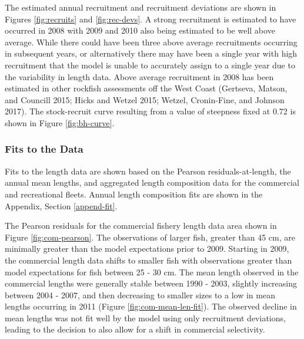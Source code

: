 \documentclass[11pt,
  english,
  a4paper,
]{article}
\begin{document}

The estimated annual recruitment and recruitment deviations are shown in Figures \ref{fig:recruits} and \ref{fig:rec-devs}. A strong recruitment is estimated to have occurred in 2008 with 2009 and 2010 also being estimated to be well above average. While there could have been three above average recruitments occurring in subsequent years, or alternatively there may have been a single year with high recruitment that the model is unable to accurately assign to a single year due to the variability in length data. Above average recruitment in 2008 has been estimated in other rockfish assessments off the West Coast {(Gertseva, Matson, and Councill 2015; Hicks and Wetzel 2015; Wetzel, Cronin-Fine, and Johnson 2017)\leavevmode\tagmcend\tagstructend}. The stock-recruit curve resulting from a value of steepness fixed at 0.72 is shown in Figure \ref{fig:bh-curve}.

\leavevmode\tagmcend\tagstructend\par


\hypertarget{fits-to-the-data}{%
\subsubsection{Fits to the Data}\label{fits-to-the-data}}

\leavevmode\tagmcend\tagstructend


Fits to the length data are shown based on the Pearson residuals-at-length, the annual mean lengths, and aggregated length composition data for the commercial and recreational fleets. Annual length composition fits are shown in the Appendix, Section \ref{append-fit}.

\leavevmode\tagmcend\tagstructend\par


The Pearson residuals for the commercial fishery length data area shown in Figure \ref{fig:com-pearson}. The observations of larger fish, greater than 45 cm, are minimally greater than the model expectations prior to 2009. Starting in 2009, the commercial length data shifts to smaller fish with observations greater than model expectations for fish between 25 - 30 cm. The mean length observed in the commercial lengths were generally stable between 1990 - 2003, slightly increasing between 2004 - 2007, and then decreasing to smaller sizes to a low in mean lengths occurring in 2011 (Figure \ref{fig:com-mean-len-fit}). The observed decline in mean lengths was not fit well by the model using only recruitment deviations, leading to the decision to also allow for a shift in commercial selectivity.
\end{document}
